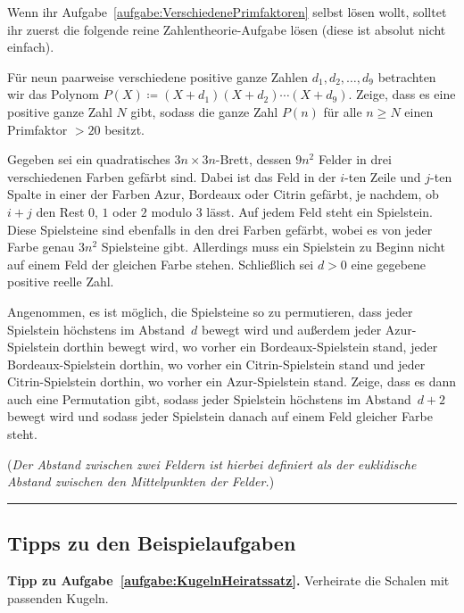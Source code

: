Wenn ihr Aufgabe~\ref{aufgabe:VerschiedenePrimfaktoren} selbst lösen wollt, solltet ihr zuerst die folgende reine Zahlentheorie-Aufgabe lösen (diese ist absolut nicht einfach).
\begin{aufgabe*}[*]\label{aufgabe:PolynomPrimfaktor}
	Für neun paarweise verschiedene positive ganze Zahlen $d_1,d_2,\dotsc,d_9$ betrachten wir das Polynom $P(X)\coloneqq (X+d_1)(X+d_2)\dotsm (X+d_9)$. Zeige, dass es eine positive ganze Zahl $N$ gibt, sodass die ganze Zahl $P(n)$ für alle $n\geqslant N$ einen Primfaktor $>20$ besitzt.
\end{aufgabe*}
\begin{aufgabe*}[*]\label{aufgabe:AzurBordeauxCitrin}
	Gegeben sei ein quadratisches $3n\times 3n$-Brett, dessen $9n^2$ Felder in drei verschiedenen Farben gefärbt sind. Dabei ist das Feld in der $i$-ten Zeile und $j$-ten Spalte in einer der Farben Azur, Bordeaux oder Citrin gefärbt, je nachdem, ob $i+j$ den Rest $0$, $1$ oder $2$ modulo $3$ lässt. Auf jedem Feld steht ein Spielstein. Diese Spielsteine sind ebenfalls in den drei Farben gefärbt, wobei es von jeder Farbe genau $3n^2$ Spielsteine gibt. Allerdings muss ein Spielstein zu Beginn nicht auf einem Feld der gleichen Farbe stehen. Schließlich sei $d>0$ eine gegebene positive reelle Zahl.
	
	Angenommen, es ist möglich, die Spielsteine so zu permutieren, dass jeder Spielstein höchstens im Abstand~$d$ bewegt wird und außerdem jeder Azur-Spielstein dorthin bewegt wird, wo vorher ein Bordeaux-Spielstein stand, jeder Bordeaux-Spielstein dorthin, wo vorher ein Citrin-Spielstein stand und jeder Citrin-Spielstein dorthin, wo vorher ein Azur-Spielstein stand. Zeige, dass es dann auch eine Permutation gibt, sodass jeder Spielstein höchstens im Abstand~$d+2$ bewegt wird und sodass jeder Spielstein danach auf einem Feld gleicher Farbe steht.
	
	(\emph{Der Abstand zwischen zwei Feldern ist hierbei definiert als der euklidische Abstand zwischen den Mittelpunkten der Felder.})
\end{aufgabe*}

\vfill\hrule\vspace{-1em}

\subsection*{Tipps zu den Beispielaufgaben}
\textbf{Tipp zu Aufgabe~\ref{aufgabe:KugelnHeiratssatz}.} Verheirate die Schalen mit passenden Kugeln.

